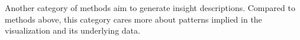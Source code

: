

Another category of methods aim to generate insight descriptions.
Compared to methods above, this category cares more about patterns implied in the visualization and its underlying data.











